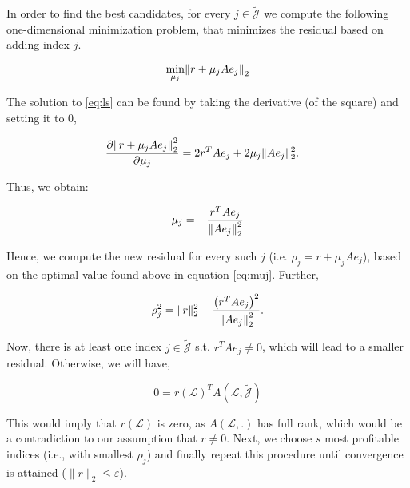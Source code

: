 \documentclass[paper=A4, fontsize=11pt]{scrartcl}
\let\originalleft\left
\let\originalright\right
\renewcommand{\left}{\mathopen{}\mathclose\bgroup\originalleft}
\renewcommand{\right}{\aftergroup\egroup\originalright}
\theoremstyle{remark}
\begin{document}
In order to find the best candidates, for every \(j \in \tilde{\mathcal{J}}\) we compute the following one-dimensional minimization problem, that minimizes the residual based on adding index $j$.

\begin{equation}\label{eq:ls}
\min _{\mu_{j}}\left\|r+\mu_{j} A e_{j}\right\|_{2}
\end{equation}

The solution to \eqref{eq:ls} can be found by taking the derivative (of the square) and setting it to 0, 

\begin{equation}
\begin{aligned}
\frac{\partial \left\|r+\mu_{j} A e_{j}\right\|_{2}^2}{\partial \mu_{j}} 
& = 2r^{T} A e_{j} + 2\mu_{j}\|A e_{j}\|_{2}^{2}.
\end{aligned}
\end{equation}

Thus, we obtain: 

\begin{equation}\label{eq:muj}
\mu_{j}=-\frac{r^{T} A e_{j}}{\left\|A e_{j}\right\|_{2}^{2}}
\end{equation}

Hence, we compute the new residual for every such $j$ (i.e.  $\rho_j = r+\mu_{j} A e_{j}$), based on the optimal value found above in equation \eqref{eq:muj}. Further, 

\begin{equation}
\rho_{j}^{2}=\|r\|_{2}^{2}-\frac{\left(r^{T} A e_{j}\right)^{2}}{\left\|A e_{j}\right\|_{2}^{2}}.
\end{equation}

Now, there is at least one index $j \in \tilde{\mathcal{J}}$ s.t. \(r^{T} A e_{j} \neq 0\), which will lead to a smaller residual. Otherwise, we will have, 

\begin{equation}
0=r(\mathcal{L})^{T} A(\mathcal{L}, \tilde{\mathcal{J}})
\end{equation}


This would imply that \(r(\mathcal{L})\) is zero, as \(A(\mathcal{L}, .)\) has full rank, which would be a contradiction to our assumption that $r \neq 0$. Next, we choose $s$ most profitable indices (i.e., with smallest $\rho_j$) and finally repeat this procedure until convergence is attained ($\|r\|_{2} \leq \varepsilon$). 
\end{document}
